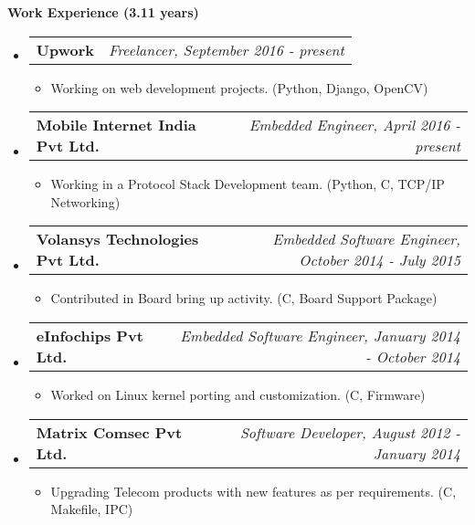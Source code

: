 \documentclass[letterpaper,10pt]{article}
\makeatletter
\newcommand{\resitem}[1]{\item #1 \vspace{-2pt}}
\newcommand{\resheading}[1]{{\large \colorbox{mygrey}{\begin{minipage}{\textwidth}{\textbf{#1 \vphantom{p\^{E}}}}\end{minipage}}}}
\newcommand{\ressubheading}[4]{
\begin{tabular*}{7.0in}{l@{\extracolsep{\fill}}r}
		\textbf{#1} & \textit{#4} \\
\end{tabular*}\vspace{-6pt}}
\makeatother
\begin{document}
\resheading{Work Experience (3.11 years)}
\begin{itemize}

\item
	\ressubheading{Upwork}{Remote}{}{Freelancer, September 2016 - present}
	\begin{itemize}
		\resitem{Working on web development projects.}(Python, Django, OpenCV)
	\end{itemize}

\item
	\ressubheading{Mobile Internet India Pvt Ltd.}{Ahmedabad, India}{}{Embedded Engineer, April 2016 - present}
	\begin{itemize}
		\resitem{Working in a Protocol Stack Development team.}(Python, C, TCP/IP Networking)
	\end{itemize}

\item
	\ressubheading{Volansys Technologies Pvt Ltd.}{Ahmedabad, India}{}{Embedded Software Engineer, October 2014 - July 2015}
	\begin{itemize}
		\resitem{Contributed in Board bring up activity.}(C, Board Support Package)
	\end{itemize}

\item
	\ressubheading{eInfochips Pvt Ltd.}{Ahmedabad, India}{}{Embedded Software Engineer, January 2014 - October 2014}
	\begin{itemize}
		\resitem{Worked on Linux kernel porting and customization.}(C, Firmware)
	\end{itemize}

\item
	\ressubheading{Matrix Comsec Pvt Ltd.}{Ahmedabad, India}{}{Software Developer, August 2012 - January 2014}
	\begin{itemize}
		\resitem{Upgrading Telecom products with new features as per requirements.}(C, Makefile, IPC)
	\end{itemize}

\end{itemize}
\end{document}
